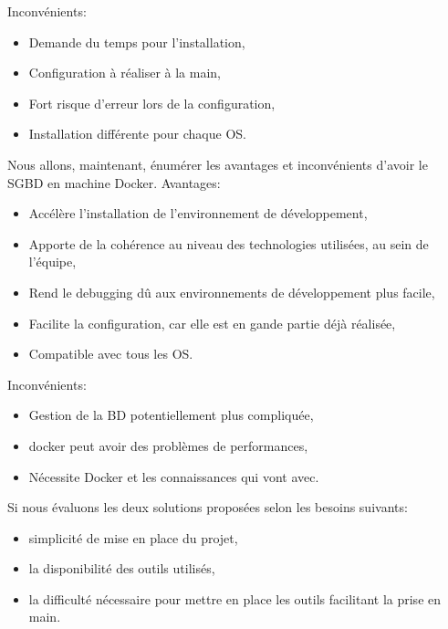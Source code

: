 \documentclass[
    iai, %
    il, %
]{heig-tb}
\begin{document}
Inconvénients:
\begin{itemize}
    \item Demande du temps pour l'installation,
    \item Configuration à réaliser à la main,
    \item Fort risque d'erreur lors de la configuration,
    \item Installation différente pour chaque OS.
\end{itemize}

Nous allons, maintenant, énumérer les avantages et inconvénients d'avoir le SGBD en machine Docker.
Avantages:
\begin{itemize}
    \item Accélère l'installation de l'environnement de développement, \cite{labrecque,data-flair_pros_cons}
    \item Apporte de la cohérence au niveau des technologies utilisées, au sein de l'équipe, \cite{labrecque, data-flair_use_cases}
    \item Rend le debugging dû aux environnements de développement plus facile, \cite{labrecque,koukia}
    \item Facilite la configuration, car elle est en gande partie déjà réalisée, \cite{data-flair_pros_cons}
    \item Compatible avec tous les OS.
\end{itemize}

Inconvénients:
\begin{itemize}
    \item Gestion de la BD potentiellement plus compliquée,
    \item \Gls{docker} peut avoir des problèmes de performances, \cite{labrecque}
    \item Nécessite Docker et les connaissances qui vont avec. \cite{labrecque}
\end{itemize}

Si nous évaluons les deux solutions proposées selon les besoins suivants:
\begin{itemize}
    \item simplicité de mise en place du projet,
    \item la disponibilité des outils utilisés,
    \item la difficulté nécessaire pour mettre en place les outils facilitant la prise en main.
\end{itemize}
\end{document}
